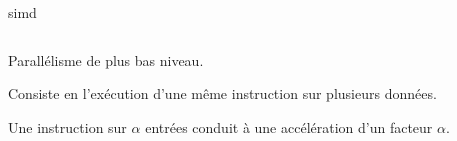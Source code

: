 \documentclass[../main.tex]{subfiles}
\begin{document}
\begin{frame}{\acrfull{simd}}
  \begin{columns}
    \begin{column}{.7\linewidth}
      \begin{ctrlitemize}{.5 em}
        \item Parallélisme de plus bas niveau.
        \item Consiste en l'exécution d'une même instruction sur plusieurs données.
        \item Une instruction sur $\alpha$ entrées conduit à une accélération d'un facteur $\alpha$.
      \end{ctrlitemize}


\end{column}
\end{columns}
\end{frame}
\end{document}
